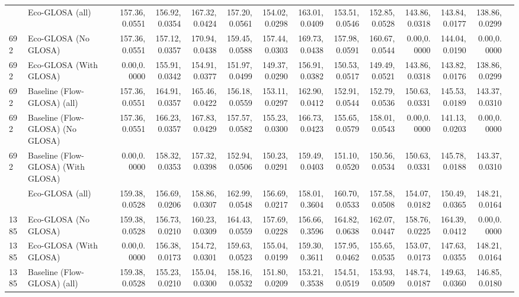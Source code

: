 \begin{table}[ht]
{\begin{tabular}{llrrrrrrrrrrrr}
        \addlinespace
        692  & Eco-GLOSA (all)                    & 157.36,0.0551 & 156.92,0.0354 & 167.32,0.0424 & 157.20,0.0561 & 154.02,0.0298 & 163.01,0.0409 & 153.51,0.0546 & 152.85,0.0528 & 143.86,0.0318 & 143.84,0.0177 & 138.86,0.0299 \\
        692  & Eco-GLOSA (No GLOSA)               & 157.36,0.0551 & 157.12,0.0357 & 170.94,0.0438 & 159.45,0.0588 & 157.44,0.0303 & 169.73,0.0438 & 157.98,0.0591 & 160.67,0.0544 & 0.00,0.0000   & 144.04,0.0190 & 0.00,0.0000   \\
        692  & Eco-GLOSA (With GLOSA)             & 0.00,0.0000   & 155.91,0.0342 & 154.91,0.0377 & 151.97,0.0499 & 149.37,0.0290 & 156.91,0.0382 & 150.53,0.0517 & 149.49,0.0521 & 143.86,0.0318 & 143.82,0.0176 & 138.86,0.0299 \\
        692  & Baseline (Flow-GLOSA) (all)        & 157.36,0.0551 & 164.91,0.0357 & 165.46,0.0422 & 156.18,0.0559 & 153.11,0.0297 & 162.90,0.0412 & 152.91,0.0544 & 152.79,0.0536 & 150.63,0.0331 & 145.53,0.0189 & 143.37,0.0310 \\
        692  & Baseline (Flow-GLOSA) (No GLOSA)   & 157.36,0.0551 & 166.23,0.0357 & 167.83,0.0429 & 157.57,0.0582 & 155.23,0.0300 & 166.73,0.0423 & 155.65,0.0579 & 158.01,0.0543 & 0.00,0.0000   & 141.13,0.0203 & 0.00,0.0000   \\
        692  & Baseline (Flow-GLOSA) (With GLOSA) & 0.00,0.0000   & 158.32,0.0353 & 157.32,0.0398 & 152.94,0.0506 & 150.23,0.0291 & 159.49,0.0403 & 151.10,0.0520 & 150.56,0.0534 & 150.63,0.0331 & 145.78,0.0188 & 143.37,0.0310 \\
        \addlinespace
        1385 & Eco-GLOSA (all)                    & 159.38,0.0528 & 156.69,0.0206 & 158.86,0.0307 & 162.99,0.0548 & 156.69,0.0217 & 158.01,0.3604 & 160.70,0.0533 & 157.58,0.0508 & 154.07,0.0182 & 150.49,0.0365 & 148.21,0.0164 \\
        1385 & Eco-GLOSA (No GLOSA)               & 159.38,0.0528 & 156.73,0.0210 & 160.23,0.0309 & 164.43,0.0559 & 157.69,0.0228 & 156.66,0.3596 & 164.82,0.0638 & 162.07,0.0447 & 158.76,0.0225 & 164.39,0.0412 & 0.00,0.0000   \\
        1385 & Eco-GLOSA (With GLOSA)             & 0.00,0.0000   & 156.38,0.0173 & 154.72,0.0301 & 159.63,0.0523 & 155.04,0.0199 & 159.30,0.3611 & 157.95,0.0462 & 155.65,0.0535 & 153.07,0.0173 & 147.63,0.0355 & 148.21,0.0164 \\
        1385 & Baseline (Flow-GLOSA) (all)        & 159.38,0.0528 & 155.23,0.0210 & 155.04,0.0300 & 158.16,0.0532 & 151.80,0.0209 & 153.21,0.3538 & 154.51,0.0519 & 153.93,0.0509 & 148.74,0.0187 & 149.63,0.0360 & 146.85,0.0180 \\

\end{tabular}}
\end{table}
